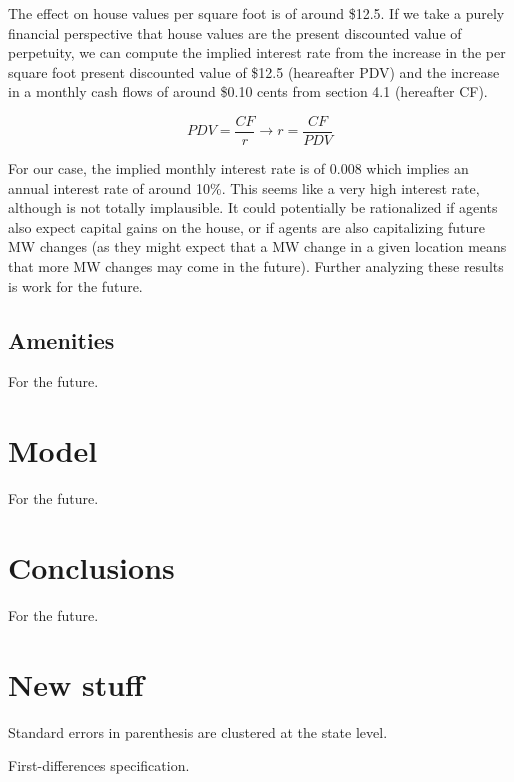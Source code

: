 \documentclass{article}
\begin{document}
The effect on house values per square foot is of around \$12.5. If we take a purely financial perspective that house values are the present discounted value of perpetuity, we can compute the implied interest rate from the increase in the per square foot present discounted value of \$12.5 (heareafter PDV) and the increase in a monthly cash flows of around \$0.10 cents from section 4.1 (hereafter CF).

\begin{equation}
    PDV = \frac{CF}{r} \to r = \frac{CF}{PDV}
\end{equation}

For our case, the implied monthly interest rate is of 0.008 which implies an annual interest rate of around 10\%. This seems like a very high interest rate, although is not totally implausible. It could potentially be rationalized if agents also expect capital gains on the house, or if agents are also capitalizing future MW changes (as they might expect that a MW change in a given location means that more MW changes may come in the future). Further analyzing these results is work for the future. 

\subsection{Amenities}

For the future. 

\section{Model}

For the future.

\section{Conclusions}

For the future.

\section{New stuff}

\begin{table}[h!]
    \centering
    \resizebox{\textwidth}{!}{
    
    }
     \vspace{1ex}
    {\raggedright Standard errors in parenthesis are clustered at the state level.\par}
    \caption{First-differences specification.}
    \label{tab:table1}
\end{table}
\end{document}
